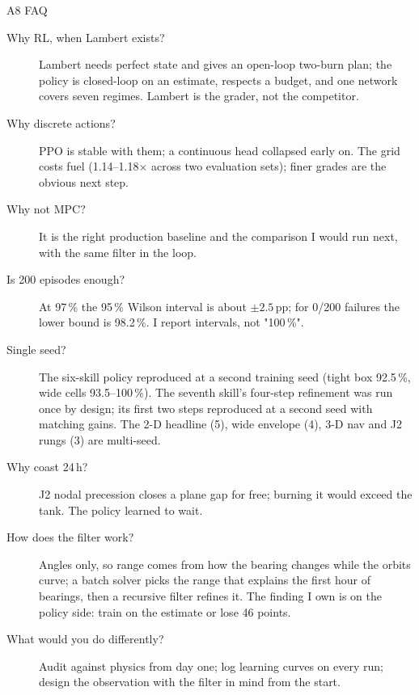 \documentclass[aspectratio=169,11pt]{beamer}
\begin{document}
\begin{frame}{A8 \; FAQ}
\scriptsize
\begin{description}
  \item[Why RL, when Lambert exists?] Lambert needs perfect state and gives an open-loop two-burn plan; the policy is closed-loop on an estimate, respects a budget, and one network covers seven regimes. Lambert is the grader, not the competitor.
  \item[Why discrete actions?] PPO is stable with them; a continuous head collapsed early on. The grid costs fuel (1.14--1.18$\times$ across two evaluation sets); finer grades are the obvious next step.
  \item[Why not MPC?] It is the right production baseline and the comparison I would run next, with the same filter in the loop.
  \item[Is 200 episodes enough?] At 97\,\% the 95\,\% Wilson interval is about $\pm2.5$\,pp; for 0/200 failures the lower bound is 98.2\,\%. I report intervals, not "100\,\%".
  \item[Single seed?] The six-skill policy reproduced at a second training seed (tight box 92.5\,\%, wide cells 93.5--100\,\%). The seventh skill's four-step refinement was run once by design; its first two steps reproduced at a second seed with matching gains. The 2-D headline (5), wide envelope (4), 3-D nav and J2 rungs (3) are multi-seed.
  \item[Why coast 24\,h?] J2 nodal precession closes a plane gap for free; burning it would exceed the tank. The policy learned to wait.
  \item[How does the filter work?] Angles only, so range comes from how the bearing changes while the orbits curve; a batch solver picks the range that explains the first hour of bearings, then a recursive filter refines it. The finding I own is on the policy side: train on the estimate or lose 46 points.
  \item[What would you do differently?] Audit against physics from day one; log learning curves on every run; design the observation with the filter in mind from the start.
\end{description}
\end{frame}
\end{document}
